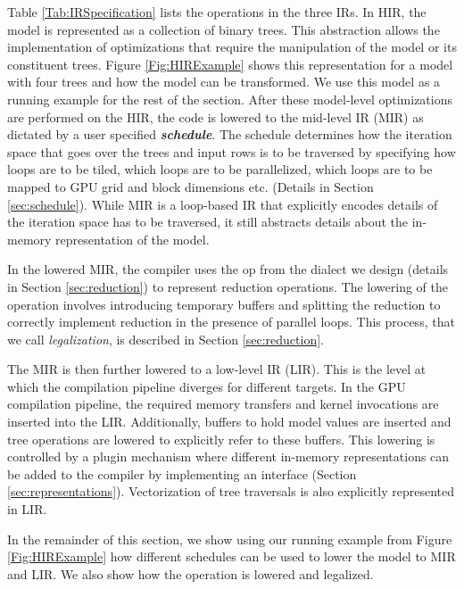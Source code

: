 Table \ref{Tab:IRSpecification} lists the operations in the three IRs. 
In HIR, the model is represented as a collection of binary trees. This abstraction
allows the implementation of optimizations that require the manipulation of the model
or its constituent trees. Figure \ref{Fig:HIRExample} shows this representation for a model 
with four trees and how the model can be transformed. We use this model as a running example 
for the rest of the section.
After these model-level optimizations are performed on the HIR, the 
code is lowered to the mid-level IR (MIR) as dictated by a user 
specified \emph{\textbf{schedule}}. The schedule determines how
the iteration space that goes over the trees and input rows is to be traversed
by specifying how loops are to be tiled, which loops are to be
parallelized, which loops are to be mapped to GPU grid and block dimensions etc.
(Details in Section \ref{sec:schedule}). While MIR is a loop-based IR that 
explicitly encodes details of the iteration space has to be traversed, 
it still abstracts details about the in-memory representation of the model. 

In the lowered MIR, the compiler uses the  op from 
the  dialect we design (details in Section \ref{sec:reduction})
to represent reduction operations. The lowering of the  operation 
involves introducing temporary buffers and splitting the reduction 
to correctly implement reduction in the presence of 
parallel loops. This process, that we call \emph{legalization}, is 
described in Section \ref{sec:reduction}. 

The MIR is then further lowered to a low-level IR (LIR). This is the
level at which the compilation pipeline diverges for different targets. In 
the GPU compilation pipeline, the required memory transfers and kernel
invocations are inserted into the LIR. Additionally, buffers 
to hold model values are inserted and tree operations are lowered to
explicitly refer to these buffers. This lowering is controlled by 
a plugin mechanism where different in-memory representations can 
be added to the compiler by implementing an interface 
(Section \ref{sec:representations}). Vectorization of tree traversals
is also explicitly represented in LIR.

In the remainder of this section, we show using our running example
from Figure \ref{Fig:HIRExample} how different schedules can be used to 
lower the model to MIR and LIR. We also show how the  operation
is lowered and legalized.

